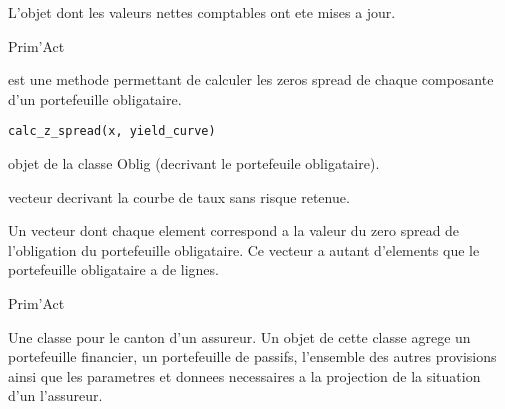 \documentclass[a4paper]{book}
\begin{document}
%
\begin{Value}
L'objet  dont les valeurs nettes comptables ont ete mises a jour.
\end{Value}
%
\begin{Author}\relax
Prim'Act
\end{Author}
%
\begin{Description}\relax
{} est une methode permettant de calculer les zeros spread de chaque composante d'un portefeuille obligataire.
\end{Description}
%
\begin{Usage}
\begin{verbatim}
calc_z_spread(x, yield_curve)
\end{verbatim}
\end{Usage}
%
\begin{Arguments}
\begin{ldescription}
\item[\code{x}] objet de la classe Oblig (decrivant le portefeuile obligataire).

\item[\code{yield\_curve}] vecteur decrivant la courbe de taux sans risque retenue.
\end{ldescription}
\end{Arguments}
%
\begin{Value}
Un vecteur dont chaque element correspond a la valeur du zero spread de l'obligation du portefeuille obligataire.
Ce vecteur a autant d'elements que le portefeuille obligataire a de lignes.
\end{Value}
%
\begin{Author}\relax
Prim'Act
\end{Author}
%
\begin{Description}\relax
Une classe pour le canton d'un assureur. Un objet de cette classe agrege un portefeuille financier,
un portefeuille de passifs, l'ensemble des autres provisions ainsi que les parametres et donnees necessaires
a la projection de la situation d'un l'assureur.
\end{Description}
%
\end{document}
